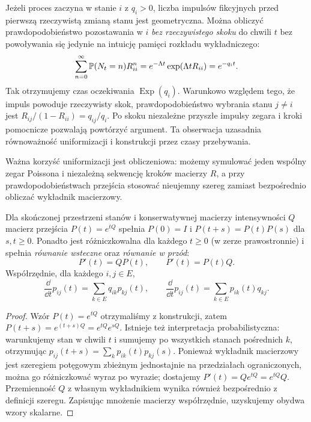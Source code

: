 \begin{uwaga}
Jeżeli proces zaczyna w stanie $i$ z $q_i>0$,
liczba impulsów fikcyjnych przed pierwszą rzeczywistą
zmianą stanu jest geometryczna. Można obliczyć
prawdopodobieństwo pozostawania w $i$ \emph{bez
rzeczywistego skoku} do chwili $t$ bez powoływania się
jedynie na intuicję pamięci rozkładu wykładniczego:
\[
\sum_{n=0}^\infty\mathbb{P}(N_t=n)R_{ii}^{n}
=e^{-\Lambda t}\exp(\Lambda tR_{ii})
=e^{-q_it}.
\]
Tak otrzymujemy czas oczekiwania $\operatorname{Exp}(q_i)$.
Warunkowo względem tego, że impuls powoduje rzeczywisty skok,
prawdopodobieństwo wybrania stanu $j\ne i$ jest
$R_{ij}/(1-R_{ii})=q_{ij}/q_i$.
Po skoku niezależne przyszłe impulsy zegara i kroki pomocnicze
pozwalają powtórzyć argument. Ta obserwacja uzasadnia
równoważność uniformizacji i konstrukcji przez czasy przebywania.
\end{uwaga}

Ważna korzyść uniformizacji jest obliczeniowa: możemy
symulować jeden wspólny zegar Poissona i niezależną sekwencję
kroków macierzy $R$, a przy prawdopodobieństwach przejścia
stosować nieujemny szereg zamiast bezpośrednio obliczać
wykładnik macierzowy.

\begin{twierdzenie}
\label{thm:kolmogorov-eq}
Dla skończonej przestrzeni stanów i konserwatywnej macierzy
intensywności $Q$ macierz przejścia $P(t)=e^{tQ}$ spełnia
$P(0)=I$ i $P(t+s)=P(t)P(s)$ dla $s,t\ge0$. Ponadto
jest różniczkowalna dla każdego $t\ge0$ (w zerze prawostronnie)
i spełnia \emph{równanie wsteczne} oraz \emph{równanie w przód}:
\[
P'(t)=QP(t),\qquad P'(t)=P(t)Q.
\]
Współrzędnie, dla każdego $i,j\in E$,
\[
\frac{\dd}{\dd t}p_{ij}(t)=\sum_{k\in E}q_{ik}p_{kj}(t),
\qquad
\frac{\dd}{\dd t}p_{ij}(t)=\sum_{k\in E}p_{ik}(t)q_{kj}.
\]
\end{twierdzenie}
\begin{proof}
Wzór $P(t)=e^{tQ}$ otrzymaliśmy z konstrukcji, zatem
$P(t+s)=e^{(t+s)Q}=e^{tQ}e^{sQ}$.
Istnieje też interpretacja probabilistyczna: warunkujemy
stan w chwili $t$ i sumujemy po wszystkich stanach
pośrednich $k$, otrzymując
$p_{ij}(t+s)=\sum_kp_{ik}(t)p_{kj}(s)$.
Ponieważ wykładnik macierzowy jest szeregiem potęgowym
zbieżnym jednostajnie na przedziałach ograniczonych,
można go różniczkować wyraz po wyrazie; dostajemy
$P'(t)=Qe^{tQ}=e^{tQ}Q$.
Przemienność $Q$ z własnym wykładnikiem wynika również
bezpośrednio z definicji szeregu.
Zapisując mnożenie macierzy współrzędnie, uzyskujemy
obydwa wzory skalarne.
\end{proof}

